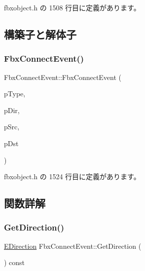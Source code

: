  fbxobject.\+h の 1508 行目に定義があります。



\subsection{構築子と解体子}
\mbox{\label{class_fbx_connect_event_a26c1e445ded5965f2e3a09643ab9b679}} 
\subsubsection{\texorpdfstring{Fbx\+Connect\+Event()}{FbxConnectEvent()}}
{\footnotesize\ttfamily Fbx\+Connect\+Event\+::\+Fbx\+Connect\+Event (\begin{DoxyParamCaption}\item[{\hyperlink{class_fbx_connect_event_aa5471711f7e440a5a236ed06b08bf1d7}{E\+Type}}]{p\+Type,  }\item[{\hyperlink{class_fbx_connect_event_a74f6cfad7f026059654d3bc6a582a78e}{E\+Direction}}]{p\+Dir,  }\item[{\hyperlink{class_fbx_property}{Fbx\+Property} $\ast$}]{p\+Src,  }\item[{\hyperlink{class_fbx_property}{Fbx\+Property} $\ast$}]{p\+Dst }\end{DoxyParamCaption})\hspace{0.3cm}{\ttfamily [inline]}}



 fbxobject.\+h の 1524 行目に定義があります。



\subsection{関数詳解}
\mbox{\label{class_fbx_connect_event_a0abc492bbba44390dbbba9d7dc9e0726}} 
\subsubsection{\texorpdfstring{Get\+Direction()}{GetDirection()}}
{\footnotesize\ttfamily \hyperlink{class_fbx_connect_event_a74f6cfad7f026059654d3bc6a582a78e}{E\+Direction} Fbx\+Connect\+Event\+::\+Get\+Direction (\begin{DoxyParamCaption}{ }\end{DoxyParamCaption}) const\hspace{0.3cm}{\ttfamily [inline]}}



